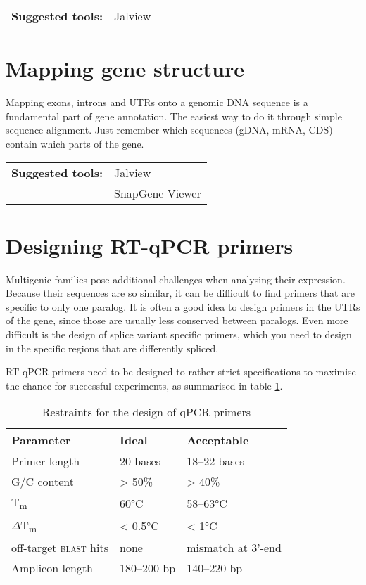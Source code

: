 \documentclass[11pt]{article}
\begin{document}
	\vspace*{\baselineskip}
	
	\noindent\begin{tabular}{@{}ll}
		\textbf{Suggested tools:}	& Jalview \\
	\end{tabular} 
	
	\section{Mapping gene structure\label{sec:str}}
	
	Mapping exons, introns and UTRs onto a genomic DNA sequence is a fundamental part of gene annotation. 
	The easiest way to do it through simple sequence alignment. Just remember which sequences (gDNA, mRNA, CDS) contain which parts of the gene.
	
	\vspace*{\baselineskip}
	
	\noindent\begin{tabular}{@{}ll}
		\textbf{Suggested tools:} & Jalview \\
		& SnapGene Viewer
	\end{tabular} 
	
	\section{Designing RT-qPCR primers\label{sec:qpcr}}
	
	Multigenic families pose additional challenges when analysing their expression. 
	Because their sequences are so similar, it can be difficult to find primers that are specific to only one paralog. 
	It is often a good idea to design primers in the UTRs of the gene, since those are usually less conserved between paralogs. 
	Even more difficult is the design of splice variant specific primers, which you need to design in the specific regions that are differently spliced.
	
	RT-qPCR primers need to be designed to rather strict specifications to maximise the chance for successful experiments, as summarised in table \ref{tab:primers}.
	\begin{table}[h!]
	\caption{Restraints for the design of qPCR primers}
	\label{tab:primers}
	\centering
	\begin{tabular}{@{}lll}
		\toprule
		Parameter & Ideal & Acceptable \\
		\midrule
		Primer length & 20 bases & 18--22 bases \\
		G/C content & > 50\% & > 40\% \\
		T\textsubscript{m}& 60°C & 58--63°C \\
		$\Delta$T\textsubscript{m} & < 0.5°C & < 1°C \\
		off-target \textsc{blast} hits & none & mismatch at 3'-end \\
		Amplicon length & 180--200 bp & 140--220 bp \\
		\bottomrule
	\end{tabular}
	\end{table}
\end{document}
